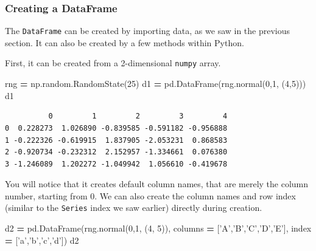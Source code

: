 \documentclass[
  letterpaper,
]{scrbook}
\newenvironment{Shaded}{\begin{snugshade}}{\end{snugshade}}
\newcommand{\DecValTok}[1]{\textcolor[rgb]{0.00,0.00,0.81}{#1}}
\newcommand{\NormalTok}[1]{#1}
\newcommand{\OperatorTok}[1]{\textcolor[rgb]{0.81,0.36,0.00}{\textbf{#1}}}
\newcommand{\StringTok}[1]{\textcolor[rgb]{0.31,0.60,0.02}{#1}}
\begin{document}
\hypertarget{creating-a-dataframe}{%
\subsubsection{Creating a DataFrame}\label{creating-a-dataframe}}

The \texttt{DataFrame} can be created by importing data, as we saw in the previous section. It can also be created by a few methods within Python.

First, it can be created from a 2-dimensional \texttt{numpy} array.

\begin{Shaded}
\begin{Highlighting}[]
\NormalTok{rng }\OperatorTok{=}\NormalTok{ np.random.RandomState(}\DecValTok{25}\NormalTok{)}
\NormalTok{d1 }\OperatorTok{=}\NormalTok{ pd.DataFrame(rng.normal(}\DecValTok{0}\NormalTok{,}\DecValTok{1}\NormalTok{, (}\DecValTok{4}\NormalTok{,}\DecValTok{5}\NormalTok{)))}
\NormalTok{d1}
\end{Highlighting}
\end{Shaded}

\begin{verbatim}
          0         1         2         3         4
0  0.228273  1.026890 -0.839585 -0.591182 -0.956888
1 -0.222326 -0.619915  1.837905 -2.053231  0.868583
2 -0.920734 -0.232312  2.152957 -1.334661  0.076380
3 -1.246089  1.202272 -1.049942  1.056610 -0.419678
\end{verbatim}

You will notice that it creates default column names, that are merely the column number, starting from 0. We can also create the column names and row index (similar to the \texttt{Series} index we saw earlier) directly during creation.

\begin{Shaded}
\begin{Highlighting}[]
\NormalTok{d2 }\OperatorTok{=}\NormalTok{ pd.DataFrame(rng.normal(}\DecValTok{0}\NormalTok{,}\DecValTok{1}\NormalTok{, (}\DecValTok{4}\NormalTok{, }\DecValTok{5}\NormalTok{)), }
\NormalTok{                  columns }\OperatorTok{=}\NormalTok{ [}\StringTok{'A'}\NormalTok{,}\StringTok{'B'}\NormalTok{,}\StringTok{'C'}\NormalTok{,}\StringTok{'D'}\NormalTok{,}\StringTok{'E'}\NormalTok{], }
\NormalTok{                  index }\OperatorTok{=}\NormalTok{ [}\StringTok{'a'}\NormalTok{,}\StringTok{'b'}\NormalTok{,}\StringTok{'c'}\NormalTok{,}\StringTok{'d'}\NormalTok{])}
\NormalTok{d2}
\end{Highlighting}
\end{Shaded}
\end{document}
